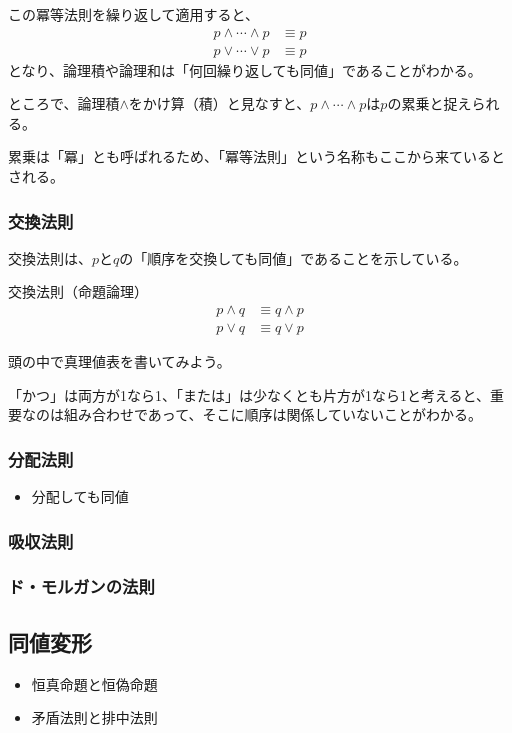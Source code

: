 \documentclass[../../imaging-math]{subfiles}
\begin{document}
\br

この冪等法則を繰り返して適用すると、
\begin{align*}
  p \land \cdots \land p & \equiv p \\
  p \lor \cdots \lor p   & \equiv p
\end{align*}
となり、論理積や論理和は「何回繰り返しても同値」であることがわかる。

\br

ところで、論理積$\land$をかけ算（積）と見なすと、$  p \land \cdots \land p$は$p$の累乗と捉えられる。

累乗は「冪」とも呼ばれるため、「冪等法則」という名称もここから来ているとされる。

\subsubsection{交換法則}

交換法則は、$p$と$q$の「順序を交換しても同値」であることを示している。

\begin{theorem}{交換法則（命題論理）}
  \large
  \begin{align*}
    p \land q & \equiv q \land p \\
    p \lor q  & \equiv q \lor p
  \end{align*}
\end{theorem}

頭の中で真理値表を書いてみよう。

「かつ」は両方が1なら1、「または」は少なくとも片方が1なら1と考えると、重要なのは組み合わせであって、そこに順序は関係していないことがわかる。

\subsubsection{分配法則}

\begin{mindflow}
  \begin{itemize}
    \item 分配しても同値
  \end{itemize}
\end{mindflow}

\subsubsection{吸収法則}

\subsubsection{ド・モルガンの法則}

\subsection{同値変形}

\begin{mindflow}
  \begin{itemize}
    \item 恒真命題と恒偽命題
    \item 矛盾法則と排中法則
  \end{itemize}
\end{mindflow}
\end{document}
